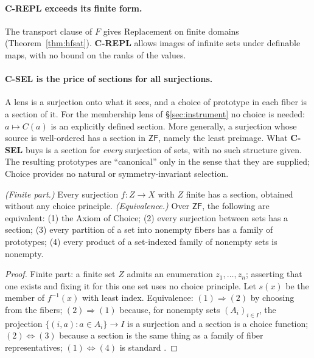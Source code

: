 \paragraph{C-REPL exceeds its finite form.} The transport clause of $F$ gives Replacement on
finite domains (Theorem~\ref{thm:hfsat}). \textbf{C-REPL} allows images of infinite sets under
definable maps, with no bound on the ranks of the values.

\paragraph{C-SEL is the price of sections for all surjections.} A lens is a surjection onto what
it sees, and a choice of prototype in each fiber is a section of it. For the membership lens of
\S\ref{sec:instrument} no choice is needed: $a\mapsto C(a)$ is an explicitly defined section.
More generally, a surjection whose source is well-ordered has a section in $\mathsf{ZF}$, namely
the least preimage. What \textbf{C-SEL} buys is a section for \emph{every} surjection of sets,
with no such structure given. The resulting prototypes are ``canonical'' only in the sense that
they are supplied; Choice provides no natural or symmetry-invariant selection.

\begin{theorem}\label{thm:choice}
\emph{(Finite part.)} Every surjection $f\colon Z\to X$ with $Z$ finite has a section, obtained
without any choice principle. \emph{(Equivalence.)} Over $\mathsf{ZF}$, the following are
equivalent: \textup{(1)} the Axiom of Choice; \textup{(2)} every surjection between sets has a
section; \textup{(3)} every partition of a set into nonempty fibers has a family of prototypes;
\textup{(4)} every product of a set-indexed family of nonempty sets is nonempty.
\end{theorem}

\begin{proof}
Finite part: a finite set $Z$ admits an enumeration $z_1,\dots,z_n$; asserting that one exists and
fixing it for this one set uses no choice principle. Let $s(x)$ be the member of $f^{-1}(x)$ with
least index. Equivalence: $(1)\Rightarrow(2)$ by choosing from the fibers; $(2)\Rightarrow(1)$
because, for nonempty sets $(A_i)_{i\in I}$, the projection $\{(i,a):a\in A_i\}\to I$ is a
surjection and a section is a choice function; $(2)\Leftrightarrow(3)$ because a section is the
same thing as a family of fiber representatives; $(1)\Leftrightarrow(4)$ is standard
\citep{Jech1973}.
\end{proof}

